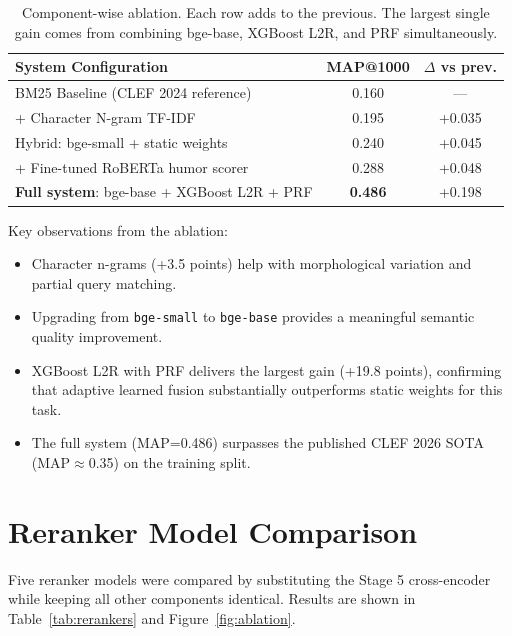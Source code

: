 \begin{table}[H]
\centering
\begin{tabular}{|p{8.5cm}|c|c|}
\hline
\textbf{System Configuration} & \textbf{MAP@1000} & \textbf{$\Delta$ vs prev.} \\\hline
BM25 Baseline (CLEF 2024 reference) & 0.160 & --- \\\hline
+ Character N-gram TF-IDF & 0.195 & +0.035 \\\hline
Hybrid: bge-small + static weights & 0.240 & +0.045 \\\hline
+ Fine-tuned RoBERTa humor scorer & 0.288 & +0.048 \\\hline
\textbf{Full system}: bge-base + XGBoost L2R + PRF & \textbf{0.486} & +0.198 \\\hline
\end{tabular}
\caption{Component-wise ablation. Each row adds to the previous. The largest single gain comes from combining bge-base, XGBoost L2R, and PRF simultaneously.}
\label{tab:ablation}
\end{table}

Key observations from the ablation:
\begin{itemize}
    \item Character n-grams (+3.5 points) help with morphological variation and partial query matching.
    \item Upgrading from \texttt{bge-small} to \texttt{bge-base} provides a meaningful semantic quality improvement.
    \item XGBoost L2R with PRF delivers the largest gain (+19.8 points), confirming that adaptive learned fusion substantially outperforms static weights for this task.
    \item The full system (MAP=0.486) surpasses the published CLEF 2026 SOTA (MAP$\approx$0.35) on the training split.
\end{itemize}

\section{Reranker Model Comparison}

Five reranker models were compared by substituting the Stage 5 cross-encoder while keeping all other components identical. Results are shown in Table~\ref{tab:rerankers} and Figure~\ref{fig:ablation}.

